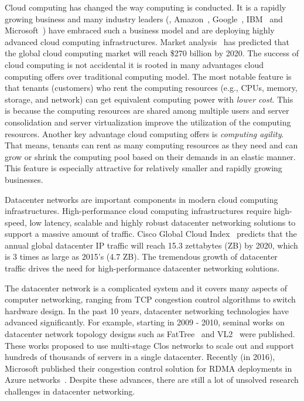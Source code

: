 
Cloud computing has changed the way computing is conducted.
It is a rapidly growing business and many industry leaders
(\eg{}, Amazon~\cite{amazon-aws}, Google~\cite{google-compute}, 
IBM~\cite{ibm-softlayer,ibm-bluemix} and
Microsoft~\cite{microsoft-azure}) have embraced such a
business model and are deploying highly advanced cloud computing infrastructures.
Market analysis~\cite{cloud-market2020}
has predicted that the global cloud computing market will
reach \$270 billion by 2020. The success of cloud computing is
not accidental \textemdash\xspace it is rooted in many advantages cloud computing offers
over traditional computing model. The most notable feature is that tenants
(customers) who rent the computing resources (e.g., CPUs, memory, storage, and network) can get equivalent computing power
with \emph{lower cost}. This is because the computing resources are shared among multiple users and
server consolidation and server virtualization improve the utilization
of the computing resources. Another key advantage cloud computing offers
is \emph{computing agility}. That means, tenants can rent as many computing
resources as they need and can grow or shrink the computing pool based on their demands 
in an elastic manner.
This feature is especially attractive for relatively smaller and
rapidly growing businesses.

Datacenter networks are important components in modern cloud computing infrastructures. 
High-performance cloud computing infrastructures require high-speed, low latency, scalable and 
highly robust datacenter networking solutions to support a massive amount of traffic. 
Cisco Global Cloud Index~\cite{cisco-predict} predicts that the annual global datacenter IP traffic will 
reach 15.3 zettabytes (ZB) by 2020, which is 3 times as large as 2015's (4.7 ZB). 
The tremendous growth of datacenter traffic drives the need for high-performance 
datacenter networking solutions. 

The datacenter network is a complicated system and it covers many 
aspects of computer networking, ranging from TCP congestion control algorithms to switch hardware design. 
In the past 10 years, datacenter networking technologies have advanced significantly. 
For example, starting in 2009 - 2010, seminal works on datacenter network topology designs such as 
FatTree~\cite{fattree} and VL2~\cite{vl2} were published. 
These works proposed to use multi-stage Clos networks to 
scale out and support hundreds of thousands of servers in a single datacenter. 
Recently (in 2016), Microsoft published their congestion control solution for 
RDMA deployments in Azure networks~\cite{zhu2015congestion}. 
Despite these advances, there are still a lot of unsolved research challenges in datacenter networking.

